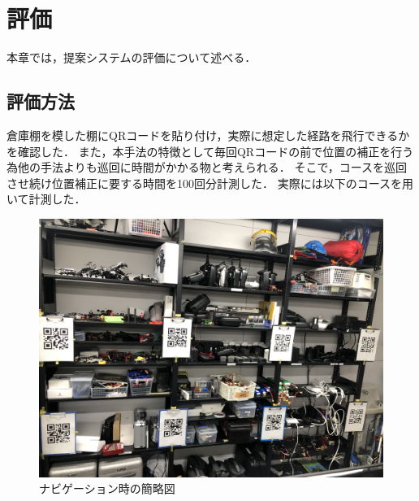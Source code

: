 \chapter{評価}
\label{evaluation}
本章では，提案システムの評価について述べる．

\section{評価方法}
倉庫棚を模した棚にQRコードを貼り付け，実際に想定した経路を飛行できるかを確認した．
また，本手法の特徴として毎回QRコードの前で位置の補正を行う為他の手法よりも巡回に時間がかかる物と考えられる．
そこで，コースを巡回させ続け位置補正に要する時間を100回分計測した．
実際には以下のコースを用いて計測した．


\begin{figure}[htbp]
  \begin{center}
    \includegraphics[clip,width=15.0cm]{img/course.jpg}
    \caption{ナビゲーション時の簡略図}
    \label{flow_sample}
  \end{center}
\end{figure}


